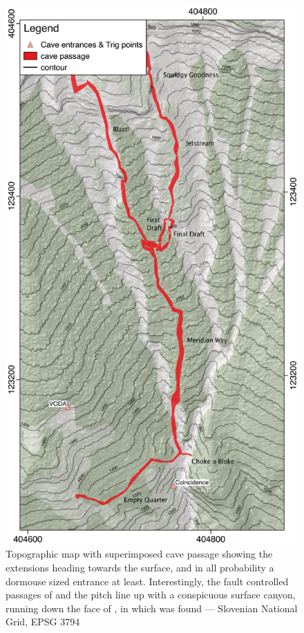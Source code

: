 \begin{figure}[t!]
\checkoddpage \ifoddpage \forcerectofloat \else \forceversofloat \fi
\centering
\includegraphics[width=\textwidth]{images/2015/tanguy-meridian-2015/meridian_map.pdf}
\caption{Topographic map with superimposed cave passage showing the \protect{} extensions heading towards the surface, and in all probability a dormouse sized entrance at least. Interestingly, the fault controlled passages of \protect{} and the \protect{} pitch line up with a conspicuous surface canyon, running down the face of \protect{}, in which \protect{} was found --- Slovenian National Grid, EPSG 3794}
\label{meridian  map}
\end{figure}


